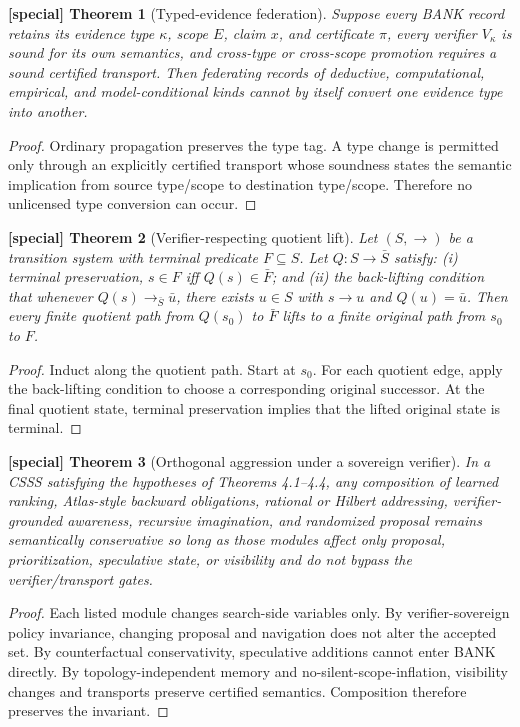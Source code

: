 \documentclass[11pt]{article}
\theoremstyle{special}
\newtheorem{specialthm}{[special] Theorem}[section]
\theoremstyle{definition}
\begin{document}
\begin{specialthm}[Typed-evidence federation]
Suppose every BANK record retains its evidence type $\kappa$, scope $E$, claim $x$, and certificate $\pi$, every verifier $V_\kappa$ is sound for its own semantics, and cross-type or cross-scope promotion requires a sound certified transport. Then federating records of deductive, computational, empirical, and model-conditional kinds cannot by itself convert one evidence type into another.
\end{specialthm}
\begin{proof}
Ordinary propagation preserves the type tag. A type change is permitted only through an explicitly certified transport whose soundness states the semantic implication from source type/scope to destination type/scope. Therefore no unlicensed type conversion can occur.\qedhere
\end{proof}

\begin{specialthm}[Verifier-respecting quotient lift]
Let $(S,\to)$ be a transition system with terminal predicate $F\subseteq S$. Let $Q:S\to\bar S$ satisfy: (i) terminal preservation, $s\in F$ iff $Q(s)\in\bar F$; and (ii) the back-lifting condition that whenever $Q(s)\to_{\bar S}\bar u$, there exists $u\in S$ with $s\to u$ and $Q(u)=\bar u$. Then every finite quotient path from $Q(s_0)$ to $\bar F$ lifts to a finite original path from $s_0$ to $F$.
\end{specialthm}
\begin{proof}
Induct along the quotient path. Start at $s_0$. For each quotient edge, apply the back-lifting condition to choose a corresponding original successor. At the final quotient state, terminal preservation implies that the lifted original state is terminal.\qedhere
\end{proof}

\begin{specialthm}[Orthogonal aggression under a sovereign verifier]
In a CSSS satisfying the hypotheses of Theorems 4.1--4.4, any composition of learned ranking, Atlas-style backward obligations, rational or Hilbert addressing, verifier-grounded awareness, recursive imagination, and randomized proposal remains semantically conservative so long as those modules affect only proposal, prioritization, speculative state, or visibility and do not bypass the verifier/transport gates.
\end{specialthm}
\begin{proof}
Each listed module changes search-side variables only. By verifier-sovereign policy invariance, changing proposal and navigation does not alter the accepted set. By counterfactual conservativity, speculative additions cannot enter BANK directly. By topology-independent memory and no-silent-scope-inflation, visibility changes and transports preserve certified semantics. Composition therefore preserves the invariant.\qedhere
\end{proof}
\end{document}
